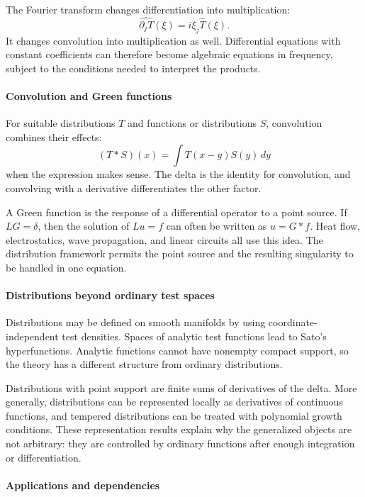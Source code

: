 The Fourier transform changes differentiation into multiplication:
\[
 \widehat{\partial_j T}(\xi)=i\xi_j\widehat T(\xi).
\]
It changes convolution into multiplication as well. Differential equations with constant coefficients can therefore become algebraic equations in frequency, subject to the conditions needed to interpret the products. \cite{distribution_theory_ref3,distribution_theory_ref8}

\paragraph{Convolution and Green functions}

For suitable distributions $T$ and functions or distributions $S$, convolution combines their effects:
\[
 (T*S)(x)=\int T(x-y)S(y)\,dy
\]
when the expression makes sense. The delta is the identity for convolution, and convolving with a derivative differentiates the other factor.

A Green function is the response of a differential operator to a point source. If $L G=\delta$, then the solution of $Lu=f$ can often be written as $u=G*f$. Heat flow, electrostatics, wave propagation, and linear circuits all use this idea. The distribution framework permits the point source and the resulting singularity to be handled in one equation.

\paragraph{Distributions beyond ordinary test spaces}

Distributions may be defined on smooth manifolds by using coordinate-independent test densities. Spaces of analytic test functions lead to Sato's hyperfunctions. Analytic functions cannot have nonempty compact support, so the theory has a different structure from ordinary distributions.

Distributions with point support are finite sums of derivatives of the delta. More generally, distributions can be represented locally as derivatives of continuous functions, and tempered distributions can be treated with polynomial growth conditions. These representation results explain why the generalized objects are not arbitrary: they are controlled by ordinary functions after enough integration or differentiation. \cite{distribution_theory_ref1,distribution_theory_ref9}

\paragraph{Applications and dependencies}

